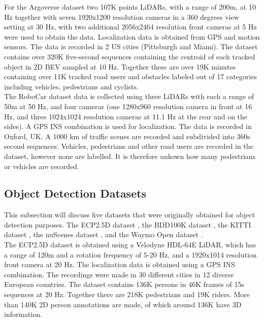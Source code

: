 For the Argoverse dataset \cite{chang2019argoverse} two 107K points LiDARs, with a range of 200m, at 10 Hz together with seven 1920x1200 resolution cameras in a 360 degrees view setting at 30 Hz, with two additional 2056x2464 resolution front cameras at 5 Hz were used to obtain the data. Localization data is obtained from GPS and motion sensors. The data is recorded in 2 US cities (Pittsburgh and Miami). The dataset contains over 320K five-second sequences containing the centroid of each tracked object in 2D \gls{BEV} sampled at 10 Hz. Together these are over 19K minutes containing over 11K tracked road users and obstacles labeled out of 17 categories including vehicles, pedestrians and cyclists. \\

The RoboCar dataset \cite{robotcardatasetijrr} data is collected using three LiDARs with each a range of 50m at 50 Hz, and four cameras (one 1280x960 resolution camera in front at 16 Hz, and three 1024x1024 resolution cameras at 11.1 Hz at the rear and on the sides). A GPS INS combination is used for localization. The data is recorded in Oxford, UK. A 1000 km of traffic scenes are recorded and subdivided into 360s second sequences. Vehicles, pedestrians and other road users are recorded in the dataset, however none are labelled. It is therefore unkown how many pedestrians or vehicles are recorded.


\subsection{Object Detection Datasets}
This subsection will discuss five datasets that were originally obtained for object detection purposes. The \gls{ECP2.5D} dataset \cite{braun2020ecp2}, the \gls{BDD100K} dataset \cite{yu2020bdd100k}, the \gls{KITTI} dataset \cite{geiger2012we}, the nuScenes dataset \cite{caesar2020nuscenes}, and the Waymo Open dataset \cite{sun2020scalability}. \\

The \gls{ECP2.5D} dataset \cite{braun2020ecp2} is obtained using a Velodyne HDL-64E LiDAR, which has a range of 120m and a rotation frequency of 5-20 Hz, and a 1920x1014 resolution front camera at 20 Hz. The localization data is obtained using a GPS INS combination. The recordings were made in 30 different cities in 12 diverse European countries. The dataset contains 136K persons in 46K frames of 15s sequences at 20 Hz. Together there are 218K pedestrians and 19K riders. More than 140K 2D person annotations are made, of which around 136K have 3D information. \\

